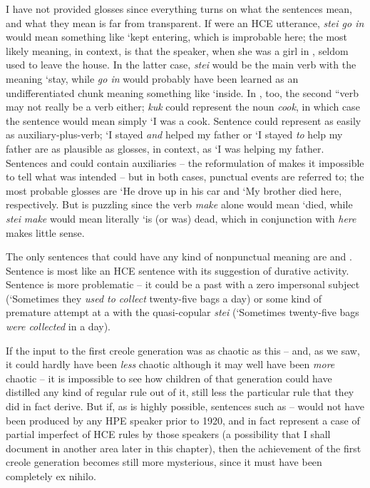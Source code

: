 \noindent I have not provided glosses since everything turns on what the sentences mean, and what they mean is far from transparent. If  were an HCE utterance, \textit{stei go in} would mean something like `kept entering, which is improbable here; the most likely meaning, in context, is that the speaker, when she was a girl in , seldom used to leave the house. In the latter case, \textit{stei} would be the main verb with the meaning `stay, while \textit{go in} would probably have been learned as an undifferentiated chunk meaning something like `inside. In , too, the second ``verb may not really be a verb either; \textit{kuk} could represent the noun \textit{cook}, in which case the sentence would mean simply `I was a cook. Sentence  could represent  as easily as auxiliary-plus-verb; `I stayed \textit{and} helped my father or `I stayed \textit{to} help my father are as plausible as glosses, in context, as `I was helping my father. Sentences  and  could contain auxiliaries -- the reformu\-lation of  makes it impossible to tell what was intended -- but in both cases, punctual events are referred to; the most probable glosses are `He drove up in his car and `My brother died here, respectively. But  is puzzling since the  verb \textit{make} alone would mean `died, while \textit{stei} \textit{make} would mean literally `is (or was) dead, which in conjunction with \textit{here} makes little sense.


The only sentences that could have any kind of nonpunctual meaning are  and . Sentence  is most like an HCE sentence with its suggestion of durative activity. Sentence  is more problematic -- it could be a past  with a zero impersonal subject (`Some\-times they \textit{used to collect} twenty-five bags a day) or some kind of premature attempt at a  with the quasi-copular \textit{stei} (`Sometimes twenty-five bags \textit{were collected} in a day).

If the input to the first creole generation was as chaotic as this -- and, as we saw, it could hardly have been \textit{less} chaotic although it may well have been \textit{more} chaotic -- it is impossible to see how children of that generation could have distilled any kind of regular rule out of it, still less the particular rule that they did in fact derive. But if, as is highly possible, sentences such as -- would not have been produced by any HPE speaker prior to 1920, and in fact represent a case of partial imperfect  of HCE rules by those speakers (a possibility that I shall document in another area later in this chapter), then the achievement of the first creole generation becomes still more mysterious, since it must have been completely ex nihilo.

